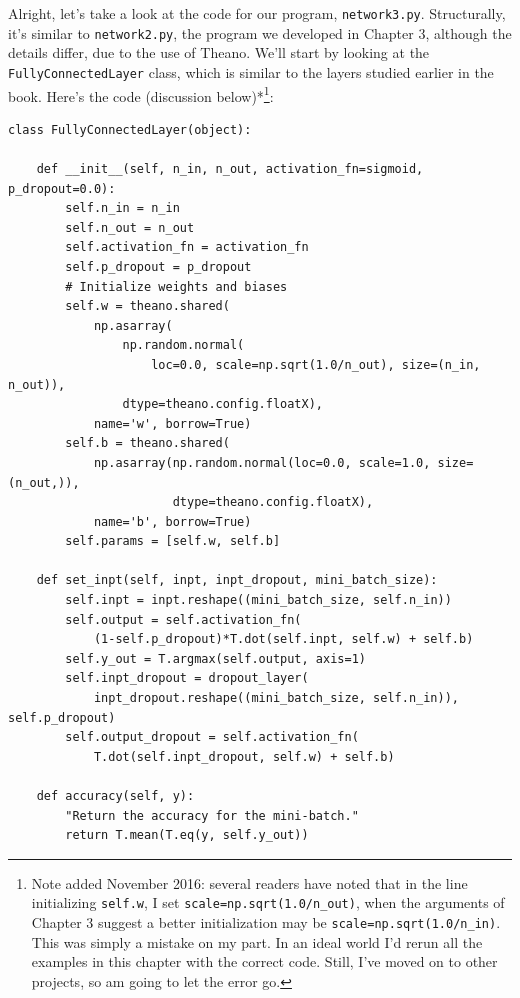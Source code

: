 

Alright, let's take a look at the code for our program, \texttt{network3.py}. Structurally, it's similar to \texttt{network2.py}, the program we developed in Chapter 3, although the details differ, due to the use of Theano. We'll start by looking at the \texttt{FullyConnectedLayer} class, which is similar to the layers studied earlier in the book. Here's the code (discussion below)*\footnote{Note added November 2016: several readers have noted that in the line initializing \texttt{self.w}, I set \texttt{scale=np.sqrt(1.0/n\_\allowbreak{}out)}, when the arguments of Chapter 3 suggest a better initialization may be \texttt{scale=np.sqrt(1.0/n\_\allowbreak{}in)}. This was simply a mistake on my part. In an ideal world I'd rerun all the examples in this chapter with the correct code. Still, I've moved on to other projects, so am going to let the error go.}:



\begin{lstlisting}
class FullyConnectedLayer(object):

    def __init__(self, n_in, n_out, activation_fn=sigmoid, p_dropout=0.0):
        self.n_in = n_in
        self.n_out = n_out
        self.activation_fn = activation_fn
        self.p_dropout = p_dropout
        # Initialize weights and biases
        self.w = theano.shared(
            np.asarray(
                np.random.normal(
                    loc=0.0, scale=np.sqrt(1.0/n_out), size=(n_in, n_out)),
                dtype=theano.config.floatX),
            name='w', borrow=True)
        self.b = theano.shared(
            np.asarray(np.random.normal(loc=0.0, scale=1.0, size=(n_out,)),
                       dtype=theano.config.floatX),
            name='b', borrow=True)
        self.params = [self.w, self.b]

    def set_inpt(self, inpt, inpt_dropout, mini_batch_size):
        self.inpt = inpt.reshape((mini_batch_size, self.n_in))
        self.output = self.activation_fn(
            (1-self.p_dropout)*T.dot(self.inpt, self.w) + self.b)
        self.y_out = T.argmax(self.output, axis=1)
        self.inpt_dropout = dropout_layer(
            inpt_dropout.reshape((mini_batch_size, self.n_in)), self.p_dropout)
        self.output_dropout = self.activation_fn(
            T.dot(self.inpt_dropout, self.w) + self.b)

    def accuracy(self, y):
        "Return the accuracy for the mini-batch."
        return T.mean(T.eq(y, self.y_out))

\end{lstlisting}


